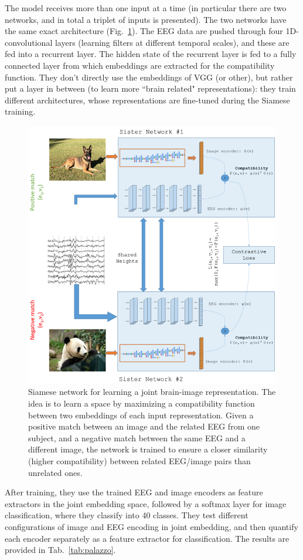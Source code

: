 The model receives more than one input at a time (in particular there are two networks, and in total a triplet of inputs is presented). The two networks have the same exact architecture (Fig.~\ref{fig:palazzo}). The EEG data are pushed through four 1D-convolutional layers (learning filters at different temporal scales), and these are fed into a recurrent layer. The hidden state of the recurrent layer is fed to a fully connected layer from which embeddings are extracted for the compatibility function.
They don't directly use the embeddings of VGG (or other), but rather put a layer in between (to learn more ``brain related" representations): they train different architectures, whose representations are fine-tuned during the Siamese training.

\begin{figure}[!ht]
    \centering
    \captionsetup{width=.8\linewidth}
    \includegraphics[width=0.6\linewidth]{images/palazzo.png}
    \caption{Siamese network for learning a joint brain-image representation. The idea is to learn a space by maximizing a compatibility function between two embeddings of each input representation. Given a positive match between an image and the related EEG from one subject, and a negative match between the same EEG and a different image, the network is trained to ensure a closer similarity (higher compatibility) between related EEG/image pairs than unrelated ones.}
    \label{fig:palazzo}
\end{figure}

After training, they use the trained EEG and image encoders as feature extractors in the joint embedding space, followed by a softmax layer for image classification, where they classify into 40 classes. They test different configurations of image and EEG encoding in joint embedding, and then quantify each encoder separately as a feature extractor for classification. The results are provided in Tab.~\ref{tab:palazzo}.

